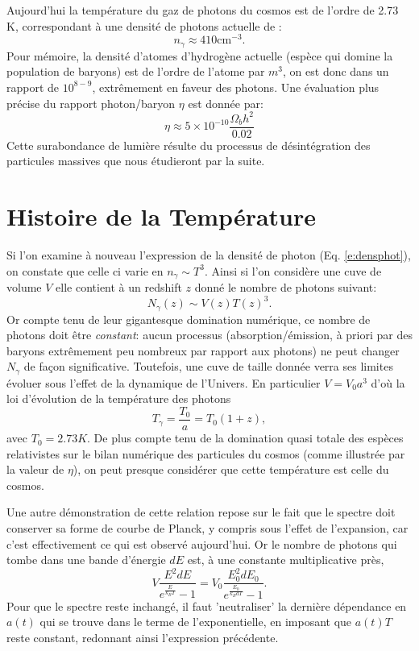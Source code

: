 Aujourd'hui la température du gaz de photons du cosmos est de l'ordre de 2.73 K, correspondant à une densité de photons actuelle de :
\begin{equation}
n_\gamma\approx 410 \mathrm{cm}^{-3}.
\end{equation}
Pour mémoire, la densité d'atomes d'hydrogène actuelle (espèce qui domine la population de baryons) est de l'ordre de l'atome par $m^3$, on est donc dans un rapport de $10^{8-9}$,  extrêmement en faveur des photons. Une évaluation plus précise du rapport photon/baryon $\eta$ est donnée par:
\begin{equation}
\eta \approx 5\times 10^{-10}\frac{\Omega_b h^2}{0.02}
\end{equation}
Cette surabondance de lumière résulte du processus de désintégration des particules massives que nous étudieront par la suite. 

\section{Histoire de la Température}

Si l'on examine à nouveau l'expression de la densité de photon (Eq. \ref{e:densphot}), on constate que celle ci varie en $n_\gamma \sim T^3$. Ainsi si l'on considère une cuve de volume $V$ elle contient à un redshift $z$ donné le nombre de photons suivant:
\begin{equation}
N_\gamma(z) \sim V(z) T(z)^3.
\end{equation}
Or compte tenu de leur gigantesque domination numérique, ce nombre de photons doit être \textit{constant}: aucun processus (absorption/émission, à priori par des baryons extrêmement peu nombreux par rapport aux photons) ne peut changer $N_\gamma$ de façon significative. Toutefois, une cuve de taille donnée verra ses limites évoluer sous l'effet de la dynamique de l'Univers. En particulier $V=V_0 a^3$ d'où la loi d'évolution de la température des photons
\begin{equation}
T_\gamma=\frac{T_0}{a}=T_0 (1+z),
\end{equation}
avec $T_0=2.73K$. De plus compte tenu de la domination quasi totale des espèces relativistes sur le bilan numérique des particules du cosmos (comme illustrée par la valeur de $\eta$), on peut presque considérer que cette température est celle du cosmos. 

Une autre démonstration de cette relation repose sur le fait que le spectre doit conserver sa forme de courbe de Planck, y compris sous l'effet de l'expansion, car c'est effectivement ce qui est observé aujourd'hui. Or le nombre de photons qui tombe dans une bande d'énergie $dE$ est, à une constante multiplicative près,
\begin{equation}
V \frac{E^2 dE}{e^{\frac{E}{k_B T}}-1}=V_0 \frac{E_0^2 dE_0}{e^{\frac{E_0}{k_B aT}}-1}.
\end{equation}
Pour que le spectre reste inchangé, il faut 'neutraliser' la dernière dépendance en $a(t)$ qui se trouve dans le terme de l'exponentielle, en imposant que $a(t) T$ reste constant, redonnant ainsi l'expression précédente.


